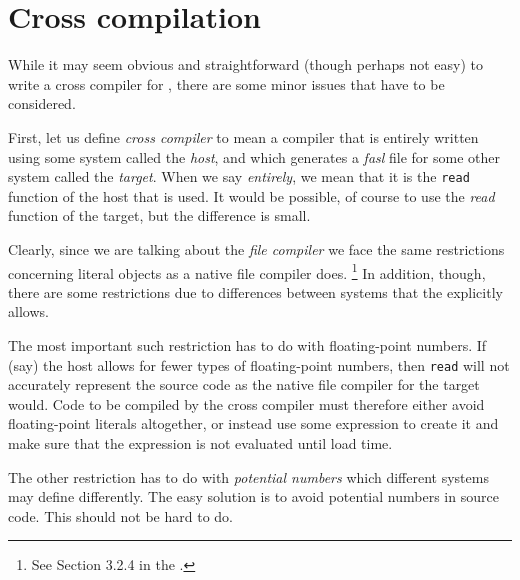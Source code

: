 \chapter{Cross compilation}
\label{chap-cross-compilation}

While it may seem obvious and straightforward (though perhaps not
easy) to write a cross compiler for \cl{}, there are some minor issues
that have to be considered. 

First, let us define \emph{cross compiler} to mean a compiler that is
entirely written using some \cl{} system called the \emph{host}, and
which generates a \emph{fasl} file for some other \cl{} system called
the \emph{target}.  When we say \emph{entirely}, we mean that it is
the \texttt{read} function of the host that is used.  It would be
possible, of course to use the \emph{read} function of the target, but
the difference is small.

Clearly, since we are talking about the \emph{file compiler} we face
the same restrictions concerning literal objects as a native file
compiler does.%
\footnote{See Section 3.2.4 in the \hs{}.} %
In addition, though, there are some restrictions due to differences
between systems that the \hs{} explicitly allows.  

The most important such restriction has to do with floating-point
numbers.  If (say) the host allows for fewer types of floating-point
numbers, then \texttt{read} will not accurately represent the source
code as the native file compiler for the target would.  Code to be
compiled by the cross compiler must therefore either avoid
floating-point literals altogether, or instead use some expression to
create it and make sure that the expression is not evaluated until
load time. 

The other restriction has to do with \emph{potential numbers} which
different systems may define differently.  The easy solution is to
avoid potential numbers in source code.  This should not be hard to
do. 



